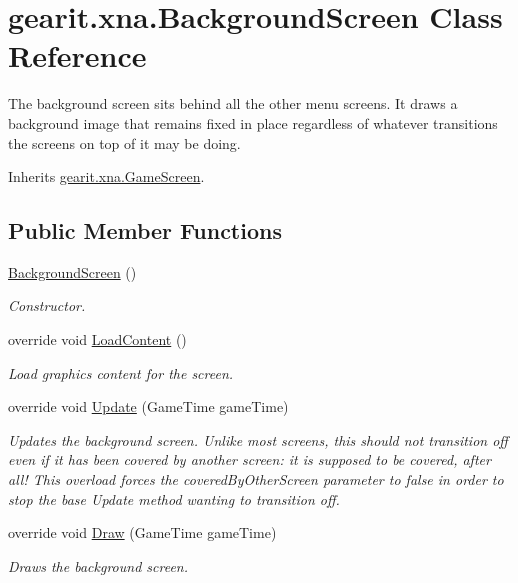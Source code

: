 \hypertarget{classgearit_1_1xna_1_1_background_screen}{\section{gearit.\+xna.\+Background\+Screen Class Reference}
\label{classgearit_1_1xna_1_1_background_screen}
}


The background screen sits behind all the other menu screens. It draws a background image that remains fixed in place regardless of whatever transitions the screens on top of it may be doing.  




Inherits \hyperlink{classgearit_1_1xna_1_1_game_screen}{gearit.\+xna.\+Game\+Screen}.

\subsection*{Public Member Functions}
\begin{DoxyCompactItemize}
\item 
\hyperlink{classgearit_1_1xna_1_1_background_screen_aa455f8f59e0b7e11ab1d0b5ef8be6cc8}{Background\+Screen} ()
\begin{DoxyCompactList}\small\item\em Constructor. \end{DoxyCompactList}\item 
override void \hyperlink{classgearit_1_1xna_1_1_background_screen_afca396e9c0fe48afc5cbd1653be9730c}{Load\+Content} ()
\begin{DoxyCompactList}\small\item\em Load graphics content for the screen. \end{DoxyCompactList}\item 
override void \hyperlink{classgearit_1_1xna_1_1_background_screen_adfee70eb27a5f151f6c5014fdd493e93}{Update} (Game\+Time game\+Time)
\begin{DoxyCompactList}\small\item\em Updates the background screen. Unlike most screens, this should not transition off even if it has been covered by another screen\+: it is supposed to be covered, after all! This overload forces the covered\+By\+Other\+Screen parameter to false in order to stop the base Update method wanting to transition off. \end{DoxyCompactList}\item 
override void \hyperlink{classgearit_1_1xna_1_1_background_screen_a87cfc05b4a8f699679624378844cc4d8}{Draw} (Game\+Time game\+Time)
\begin{DoxyCompactList}\small\item\em Draws the background screen. \end{DoxyCompactList}\end{DoxyCompactItemize}

